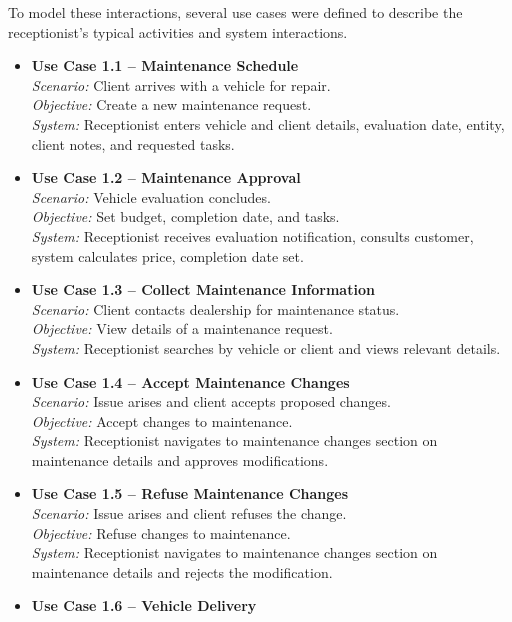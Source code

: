 To model these interactions, several use cases were defined to describe the receptionist's typical activities and system interactions.


\begin{itemize}
    \item \textbf{Use Case 1.1 – Maintenance Schedule}\\
    \textit{Scenario:} Client arrives with a vehicle for repair.\\
    \textit{Objective:} Create a new maintenance request.\\
    \textit{System:} Receptionist enters vehicle and client details, evaluation date, entity, client notes, and requested tasks.
    \item \textbf{Use Case 1.2 – Maintenance Approval}\\
    \textit{Scenario:} Vehicle evaluation concludes.\\
    \textit{Objective:} Set budget, completion date, and tasks.\\
    \textit{System:} Receptionist receives evaluation notification, consults customer, system calculates price, completion date set.
    \item \textbf{Use Case 1.3 – Collect Maintenance Information}\\
    \textit{Scenario:} Client contacts dealership for maintenance status.\\
    \textit{Objective:} View details of a maintenance request.\\
    \textit{System:} Receptionist searches by vehicle or client and views relevant details.
    \item \textbf{Use Case 1.4 – Accept Maintenance Changes}\\
    \textit{Scenario:} Issue arises and client accepts proposed changes.\\
    \textit{Objective:} Accept changes to maintenance.\\
    \textit{System:} Receptionist navigates to maintenance changes section on maintenance details and approves modifications.
    \item \textbf{Use Case 1.5 – Refuse Maintenance Changes}\\
    \textit{Scenario:} Issue arises and client refuses the change.\\
    \textit{Objective:} Refuse changes to maintenance.\\
    \textit{System:} Receptionist navigates to maintenance changes section on maintenance details and rejects the modification.
    \item \textbf{Use Case 1.6 – Vehicle Delivery}\\

\end{itemize}
